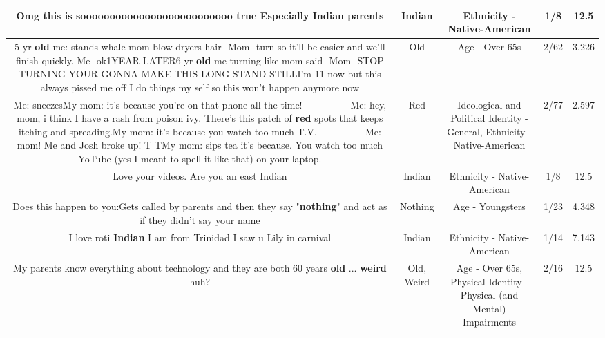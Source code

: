 \documentclass[11pt]{article}
\newlength\mylength
\begin{document}
\begin{center}
\begin{longtable}{|C{.65\mylength}|C{.30\mylength}|C{.12\mylength}|C{.12\mylength}|C{.12\mylength}|}
  \small Omg this is soooooooooooooooooooooooooo true Especially \textbf{Indian} parents\normalsize   & Indian & Ethnicity - Native-American & 1/8 & 12.5 \\  \hline
  \small 5 yr \textbf{old} me: stands whale mom blow dryers hair- Mom- turn so it'll be easier and we'll finish quickly. Me- ok1YEAR LATER6 yr \textbf{old} me turning like mom said- Mom- STOP TURNING YOUR GONNA MAKE THIS LONG STAND STILLI'm 11 now but this always pissed me off I do things my self so this won't happen anymore now\normalsize   & Old & Age - Over 65s & 2/62 & 3.226 \\  \hline
  \small Me: sneezesMy mom: it's because you're on that phone all the time!—————Me: hey, mom, i think I have a rash from poison ivy. There's this patch of \textbf{r\textbf{ed}} spots that keeps itching and spreading.My mom: it's because you watch too much T.V.—————Me: mom! Me and Josh broke up! T TMy mom: sips tea it's because. You watch too much YoTube (yes I meant to spell it like that) on your laptop.\normalsize   & Red &  Ideological and Political Identity - General, Ethnicity - Native-American & 2/77 & 2.597 \\  \hline
  \small Love your videos. Are you  an east Indian\normalsize   & Indian & Ethnicity - Native-American & 1/8 & 12.5 \\  \hline
  \small Does this happen to you:Gets called by parents and then they say "\textbf{nothing}" and act as if they didn't say your name\normalsize   & Nothing & Age - Youngsters & 1/23 & 4.348 \\  \hline
  \small I love roti  \textbf{Indian} I am from Trinidad  I saw u Lily in carnival\normalsize   & Indian & Ethnicity - Native-American & 1/14 & 7.143 \\  \hline
  \small My parents know everything about technology and they are both 60 years \textbf{old} ... \textbf{weird} huh?\normalsize   & Old, Weird & Age - Over 65s, Physical Identity - Physical (and Mental) Impairments & 2/16 & 12.5 \\  \hline

\end{longtable}
\end{center}
\end{document}
